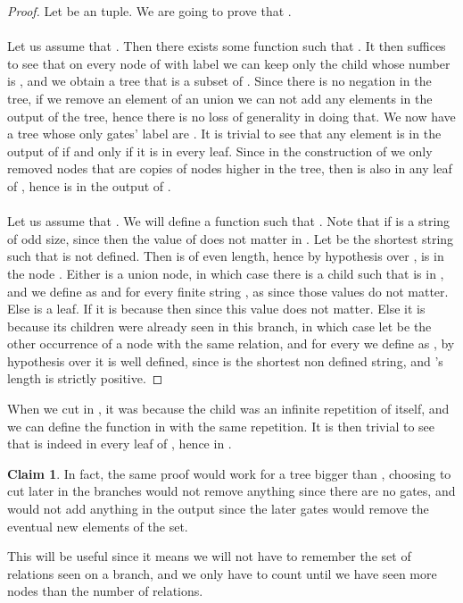 \documentclass[a4paper,12pt]{article}
\theoremstyle{definition}
\newtheorem{claim}[theorem]{Claim}
\begin{document}
\begin{proof}
  Let  be an tuple. We are going to prove that .

  \paragraph{} Let us assume that . Then there exists some function  such that
  . It then suffices to see that on
  every node  of  with label  we can
  keep only the child whose number is , and we obtain a tree
  that is a subset of . Since there is no
  negation in the tree, if we remove an element of an union we can not
  add any elements in the output of the tree, hence there is no loss
  of generality in doing that. We now have a tree  whose only
  gates' label are .  It is trivial to see that any element
   is in the output of  if and only if it is in every
  leaf. Since in the construction of  we only
  removed nodes that are copies of nodes higher in the tree, then
   is also in any leaf of , hence
   is in the output of .

  \paragraph{} Let us assume that . We will define a function  such that . Note that  if  is a string
  of odd size, since then the value of  does not matter in
  . Let  be the shortest string such that
   is not defined. Then  is of even length, hence by
  hypothesis over ,  is in the node .
  Either  is a union node, in which case there is a child  such
  that  is in , and we define  as  and for every
  finite string ,  as  since those values do not
  matter. Else  is a leaf. If it is because 
  then  since this value does not matter. Else it is because
  its children were already seen in this branch, in which case let  be the
  other occurrence of a node with the same relation,  and for
  every  we define  as , by hypothesis over  it is
  well defined, since  is the shortest non defined string, and
  's length is strictly positive.
\end{proof}

When we cut in , it was because the child
was an infinite repetition of itself, and we  can define the
function  in  with the same repetition. It
is then trivial to see that  is indeed in every leaf of
, hence in .
\begin{claim}\label{AFP}
  In fact, the same proof would work for a tree bigger than
  , choosing to cut later in the branches would not
  remove anything since there are no  gates, and would not add
  anything in the output since the later  gates would remove the
  eventual new elements of the set.
\end{claim}
This will be useful since it means we will not have to remember the
set of relations seen on a branch, and we only have to count until we
have seen more nodes than the number of relations.
\end{document}
